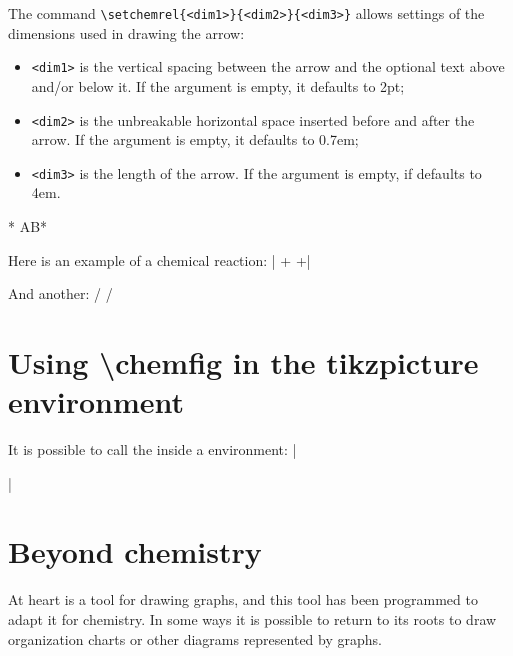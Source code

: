 \documentclass[10pt]{article}
\begin{document}
\label{setchemrel}The command \verb-\setchemrel{<dim1>}{<dim2>}{<dim3>}-\idx*{\setchemrel} allows settings of the dimensions used in drawing the arrow:
\begin{itemize}
	\item \verb-<dim1>- is the vertical spacing between the arrow and the optional text above and/or below it. If the argument is empty, it defaults to 2pt;
	\item \verb-<dim2>- is the unbreakable horizontal space inserted before and after the arrow. If the argument is empty, it defaults to 0.7em;
	\item \verb-<dim3>- is the length of the arrow. If the argument is empty, if defaults to 4em.
\end{itemize}

*\setchemrel{1pt}{}{6em}
AB*

Here is an example of a chemical reaction:
|\setchemrel{0pt}{1.2em}{6em}
\chemsign+
\chemsign+|

And another:
/
/

\section{Using {\protect\ttfamily\protect\textbackslash chemfig} in the {\protect\ttfamily tikzpicture} environment}
It is possible to call the \idx{\chemfig} inside a {\ttfamily{}} environment:
||

\section{Beyond chemistry}\label{style.noeuds}
At heart \CF is a tool for drawing graphs, and this tool has been programmed to adapt it for chemistry. In some ways it is possible to return \CF to its roots to draw organization charts or other diagrams represented by graphs.
\end{document}
